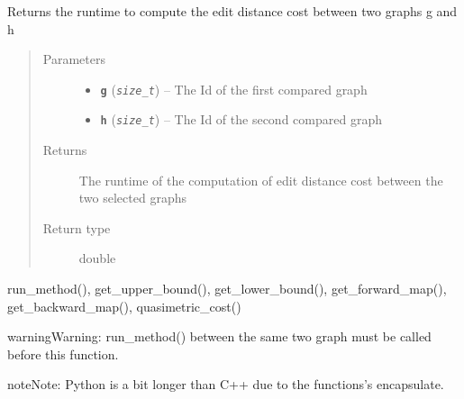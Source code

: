 \documentclass[letterpaper,10pt,english]{sphinxmanual}
\begin{document}
\begin{fulllineitems}
\label{doc:gedlibpy.get_runtime}
Returns the runtime to compute the edit distance cost between two graphs g and h
\begin{quote}\begin{description}
\item[{Parameters}] \leavevmode\begin{itemize}
\item {} 
\textbf{\texttt{g}} (\emph{\texttt{size\_t}}) -- The Id of the first compared graph

\item {} 
\textbf{\texttt{h}} (\emph{\texttt{size\_t}}) -- The Id of the second compared graph

\end{itemize}

\item[{Returns}] \leavevmode
The runtime of the computation of edit distance cost between the two selected graphs

\item[{Return type}] \leavevmode
double

\end{description}\end{quote}




run\_method(), get\_upper\_bound(), get\_lower\_bound(),  get\_forward\_map(), get\_backward\_map(), quasimetric\_cost()



\begin{notice}{warning}{Warning:}
run\_method() between the same two graph must be called before this function.
\end{notice}

\begin{notice}{note}{Note:}
Python is a bit longer than C++ due to the functions's encapsulate.
\end{notice}

\end{fulllineitems}

\end{document}
